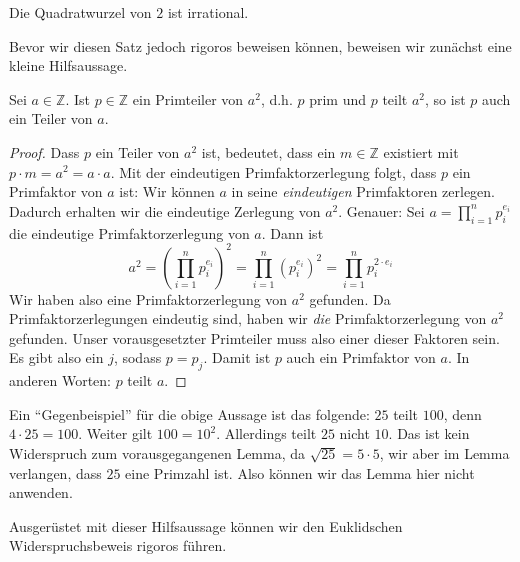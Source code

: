 \begin{theorem}\label{thm:quadratwurzel-2-irrational}
    Die Quadratwurzel von \(2\) ist irrational. 
\end{theorem}
Bevor wir diesen Satz jedoch rigoros beweisen können, beweisen wir zunächst eine kleine Hilfsaussage.
\begin{lemma}\label{lem:primteiler-von-quadraten}
    Sei \(a \in \mathbb Z\). Ist \(p \in \mathbb Z\) ein Primteiler von \(a^2\), d.h. \(p\) prim und \(p\) teilt \(a^2\), so ist \(p\) auch ein Teiler von \(a\). 
\end{lemma}
\begin{proof}
    Dass \(p\) ein Teiler von \(a^2\) ist, bedeutet, dass ein \(m \in \mathbb Z\) existiert mit \(p \cdot m = a^2 = a\cdot a\). Mit der eindeutigen Primfaktorzerlegung folgt, dass \(p\) ein Primfaktor von \(a\) ist: Wir können \(a\) in seine \textit{eindeutigen} Primfaktoren zerlegen. Dadurch erhalten wir die eindeutige Zerlegung von \(a^2\). Genauer: Sei \(a = \prod_{i=1}^n p_i^{e_i}\) die eindeutige Primfaktorzerlegung von \(a\). Dann ist 
    \begin{equation*}
        a^2 = \left(\prod_{i=1}^n p_i^{e_i}\right)^2 = \prod_{i=1}^n (p_i^{e_i})^2 = \prod_{i=1}^n p_i^{2\cdot e_i}
    \end{equation*}
    Wir haben also eine Primfaktorzerlegung von \(a^2\) gefunden. Da Primfaktorzerlegungen eindeutig sind, haben wir \textit{die} Primfaktorzerlegung von \(a^2\) gefunden. Unser vorausgesetzter Primteiler muss also einer dieser Faktoren sein. Es gibt also ein \(j\), sodass \(p = p_j\). Damit ist \(p\) auch ein Primfaktor von \(a\). In anderen Worten: \(p\) teilt \(a\). 
\end{proof}
\begin{example}
    Ein "`Gegenbeispiel"' für die obige Aussage ist das folgende: \(25\) teilt \(100\), denn \(4\cdot 25 = 100\). Weiter gilt \(100 = 10^2\). Allerdings teilt \(25\) nicht \(10\). Das ist kein Widerspruch zum vorausgegangenen Lemma, da \(\sqrt{25} = 5 \cdot 5\), wir aber im Lemma verlangen, dass \(25\) eine Primzahl ist. Also können wir das Lemma hier nicht anwenden. 
\end{example}
Ausgerüstet mit dieser Hilfsaussage können wir den Euklidschen Widerspruchsbeweis rigoros führen. 

